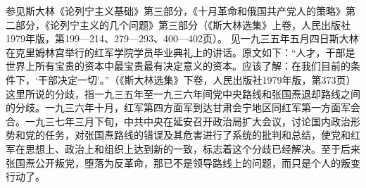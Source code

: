 \begin{maonote}
参见斯大林《论列宁主义基础》第三部分，《十月革命和俄国共产党人的策略》第二部分，《论列宁主义的几个问题》第三部分（《斯大林选集》上卷，人民出版社1979年版，第199—214、279—293、400—402页）。
见一九三五年五月四日斯大林在克里姆林宫举行的红军学院学员毕业典礼上的讲话。原文如下：“人才，干部是世界上所有宝贵的资本中最宝贵最有决定意义的资本。应该了解：在我们目前的条件下，‘干部决定一切’。”（《斯大林选集》下卷，人民出版社1979年版，第373页）
这里所说的分歧，指一九三五年至一九三六年间党中央路线和张国焘退却路线之间的分歧。一九三六年十月，红军第四方面军到达甘肃会宁地区同红军第一方面军会合。一九三七年三月下旬，中共中央在延安召开政治局扩大会议，讨论国内政治形势和党的任务，对张国焘路线的错误及其危害进行了系统的批判和总结，使党和红军在思想上、政治上和组织上达到新的一致，标志着这个分歧已经解决。至于后来张国焘公开叛党，堕落为反革命，那已不是领导路线上的问题，而只是个人的叛变行动了。
\end{maonote}

